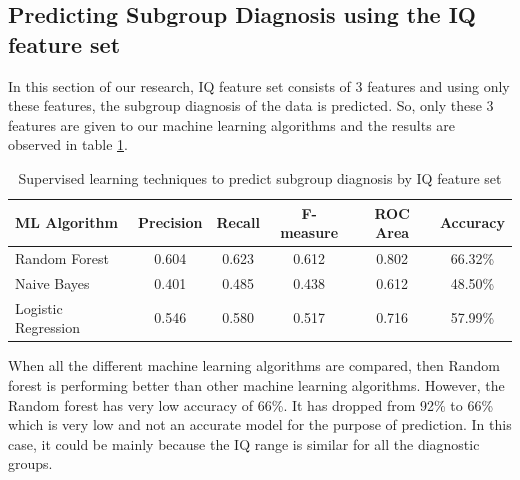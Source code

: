 \subsection{Predicting Subgroup Diagnosis using the IQ feature set}
In this section of our research, IQ feature set consists of 3 features and using only these features, the subgroup diagnosis of the data is predicted. So, only these 3 features are given to our machine learning algorithms and the results are observed in table \ref{table:44}.
\begin{table}[h]
\begin{center}
\begin{tabular}{|l|c|c|c|c|c|}
\hline
\textbf{ML Algorithm} &	\textbf{Precision}&	\textbf{Recall}&	\textbf{F-measure}& \textbf{ ROC Area}&	\textbf{Accuracy}\\
\hline \hline
Random Forest&	0.604&	0.623&	0.612&	0.802&	66.32\%\\
\hline
Naive Bayes&	0.401&	0.485&	0.438&	0.612&	48.50\%\\
\hline
Logistic Regression&	0.546&	0.580&	0.517&	0.716&	57.99\%\\
\hline
\end{tabular}
\end{center}
\caption{Supervised learning techniques to predict subgroup diagnosis by IQ feature set}
\label{table:44}
\end{table}

When all the different machine learning algorithms are compared, then Random forest is performing better than other machine learning algorithms. However, the Random forest has very low accuracy of 66\%. It has dropped from 92\% to 66\% which is very low and not an accurate model for the purpose of prediction. In this case, it could be mainly because the IQ range is similar for all the diagnostic groups.


